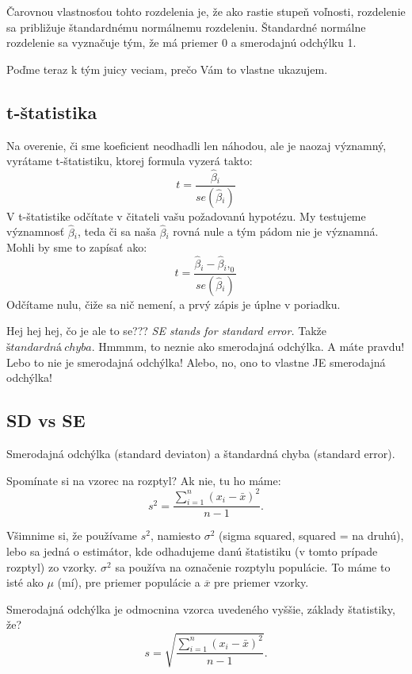 Čarovnou vlastnosťou tohto rozdelenia je, že ako rastie stupeň voľnosti,
rozdelenie sa približuje štandardnému normálnemu rozdeleniu. Štandardné
normálne rozdelenie sa vyznačuje tým, že má priemer 0 a smerodajnú
odchýlku 1.

Poďme teraz k tým juicy veciam, prečo Vám to vlastne ukazujem.

\hypertarget{t-ux161tatistika}{%
\subsection{t-štatistika}\label{t-ux161tatistika}}

Na overenie, či sme koeficient neodhadli len náhodou, ale je naozaj
významný, vyrátame t-štatistiku, ktorej formula vyzerá takto:
\[t = \frac{\hat\beta{}_i}{se(\hat\beta{}_i)}\] V t-štatistike odčítate
v čitateli vašu požadovanú hypotézu. My testujeme významnosť
\(\hat\beta{}_i\), teda či sa naša \(\hat\beta{}_i\) rovná nule a tým
pádom nie je významná. Mohli by sme to zapísať ako:
\[t = \frac{\hat\beta{}_i - \hat\beta{}_i,_0}{se(\hat\beta{}_i)}\]
Odčítame nulu, čiže sa nič nemení, a prvý zápis je úplne v poriadku.

Hej hej hej, čo je ale to se??? \emph{SE stands for standard error.}
Takže \(štandardná \ chyba\). Hmmmm, to neznie ako smerodajná odchýlka. A
máte pravdu! Lebo to nie je smerodajná odchýlka! Alebo, no, ono to
vlastne JE smerodajná odchýlka!

\hypertarget{sd-vs-se}{%
\subsection{SD vs SE}\label{sd-vs-se}}

Smerodajná odchýlka (standard deviaton) a štandardná chyba (standard
error).

Spomínate si na vzorec na rozptyl? Ak nie, tu ho máme:
\[s^{2} = \frac{\sum_{i=1}^{n} \left(x_{i} - \bar{x}\right)^{2}} {n-1}.\]

Všimnime si, že používame \(s^{2}\), namiesto \(\sigma^{2}\) (sigma
squared, squared = na druhú), lebo sa jedná o estimátor, kde odhadujeme
danú štatistiku (v tomto prípade rozptyl) zo vzorky. \(\sigma^{2}\) sa
používa na označenie rozptylu populácie. To máme to isté ako \(\mu\)
(mí), pre priemer populácie a \(\overline{x}\) pre priemer vzorky.

Smerodajná odchýlka je odmocnina vzorca uvedeného vyššie, základy
štatistiky, že?
\[s = \sqrt{\frac{\sum_{i=1}^{n} \left(x_{i} - \bar{x}\right)^{2}} {n-1}}.\]

